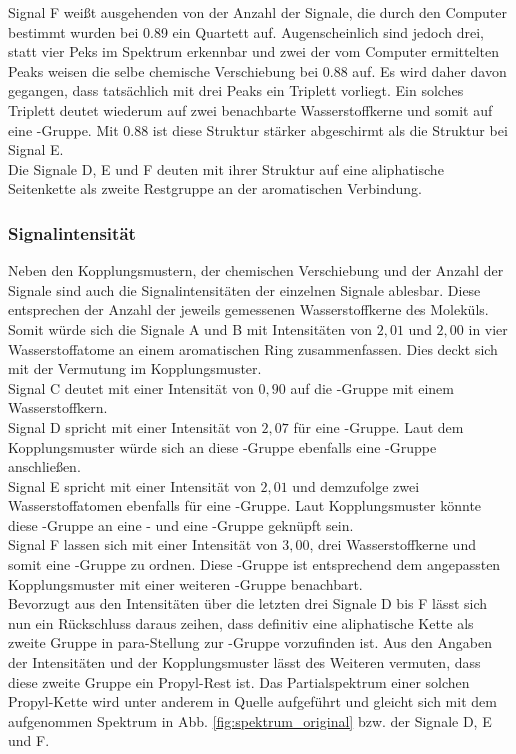 Signal F weißt ausgehenden von der Anzahl der Signale, die durch den Computer bestimmt wurden bei \SI{0,89}{\ppm} ein Quartett auf. Augenscheinlich sind jedoch drei, statt vier Peks im Spektrum erkennbar und zwei der vom Computer ermittelten Peaks weisen die selbe chemische Verschiebung bei \SI{0,88}{\ppm} auf. Es wird daher davon gegangen, dass tatsächlich mit drei Peaks ein Triplett vorliegt. Ein solches Triplett deutet wiederum auf zwei benachbarte Wasserstoffkerne und somit auf eine -Gruppe. Mit \SI{0,88}{\ppm} ist diese Struktur stärker abgeschirmt als die Struktur bei Signal E.\\
Die Signale D, E und F deuten mit ihrer Struktur auf eine aliphatische Seitenkette als zweite Restgruppe an der aromatischen Verbindung.

\subsubsection*{Signalintensität}
Neben den Kopplungsmustern, der chemischen Verschiebung und der Anzahl der Signale sind auch die Signalintensitäten der einzelnen Signale ablesbar. Diese entsprechen der Anzahl der jeweils gemessenen Wasserstoffkerne des Moleküls.\\
Somit würde sich die Signale A und B mit Intensitäten von $2,01$ und $2,00$ in vier Wasserstoffatome an einem aromatischen Ring zusammenfassen. Dies deckt sich mit der Vermutung im Kopplungsmuster. \\
Signal C deutet mit einer Intensität von $0,90$ auf die -Gruppe mit einem Wasserstoffkern.\\
 Signal D spricht mit einer Intensität von $2,07$ für eine -Gruppe. Laut dem Kopplungsmuster würde sich an diese -Gruppe ebenfalls eine -Gruppe anschließen.\\
 Signal E spricht mit einer Intensität von $2,01$ und demzufolge zwei Wasserstoffatomen ebenfalls für eine -Gruppe. Laut Kopplungsmuster könnte diese -Gruppe an eine - und eine -Gruppe geknüpft sein.\\
 Signal F lassen sich mit einer Intensität von $3,00$, drei Wasserstoffkerne und somit eine -Gruppe zu ordnen. Diese -Gruppe ist entsprechend dem angepassten Kopplungsmuster mit einer weiteren -Gruppe benachbart.\\
 Bevorzugt aus den Intensitäten über die letzten drei Signale D bis F lässt sich nun ein Rückschluss daraus zeihen, dass definitiv eine aliphatische Kette als zweite Gruppe in para-Stellung zur -Gruppe vorzufinden ist. Aus den Angaben der Intensitäten und der Kopplungsmuster lässt des Weiteren vermuten, dass diese zweite Gruppe ein Propyl-Rest ist. Das Partialspektrum einer solchen Propyl-Kette wird unter anderem in Quelle \cite[S. 17]{Breitmaier.2005} aufgeführt und gleicht sich mit dem aufgenommen Spektrum in Abb. \ref{fig:spektrum_original} bzw. der Signale D, E und F. 
 

